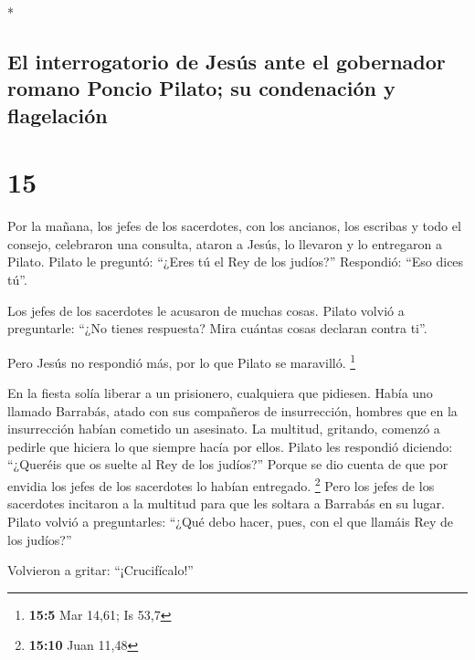 \begin{paracol}{2}
\begin{otherlanguage}{english}
\end{otherlanguage}

\switchcolumn[0]*

\hypertarget{el-interrogatorio-de-jesuxfas-ante-el-gobernador-romano-poncio-pilato-su-condenaciuxf3n-y-flagelaciuxf3n}{%
\subsection{El interrogatorio de Jesús ante el gobernador romano Poncio
Pilato; su condenación y
flagelación}\label{el-interrogatorio-de-jesuxfas-ante-el-gobernador-romano-poncio-pilato-su-condenaciuxf3n-y-flagelaciuxf3n}}

\hypertarget{section-27}{%
\section{15}\label{section-27}}

 Por la mañana, los jefes de los sacerdotes, con los
ancianos, los escribas y todo el consejo, celebraron una consulta,
ataron a Jesús, lo llevaron y lo entregaron a Pilato. 
Pilato le preguntó: ``¿Eres tú el Rey de los judíos?'' Respondió: ``Eso
dices tú''.

 Los jefes de los sacerdotes le acusaron de muchas cosas.
 Pilato volvió a preguntarle: ``¿No tienes respuesta? Mira
cuántas cosas declaran contra ti''.

 Pero Jesús no respondió más, por lo que Pilato se
maravilló. \footnote{\textbf{15:5} Mar 14,61; Is 53,7}

 En la fiesta solía liberar a un prisionero, cualquiera
que pidiesen.  Había uno llamado Barrabás, atado con sus
compañeros de insurrección, hombres que en la insurrección habían
cometido un asesinato.  La multitud, gritando, comenzó a
pedirle que hiciera lo que siempre hacía por ellos. 
Pilato les respondió diciendo: ``¿Queréis que os suelte al Rey de los
judíos?''  Porque se dio cuenta de que por envidia los
jefes de los sacerdotes lo habían entregado. \footnote{\textbf{15:10}
  Juan 11,48}  Pero los jefes de los sacerdotes incitaron
a la multitud para que les soltara a Barrabás en su lugar.
 Pilato volvió a preguntarles: ``¿Qué debo hacer, pues,
con el que llamáis Rey de los judíos?''

 Volvieron a gritar: ``¡Crucifícalo!''


\end{paracol}
